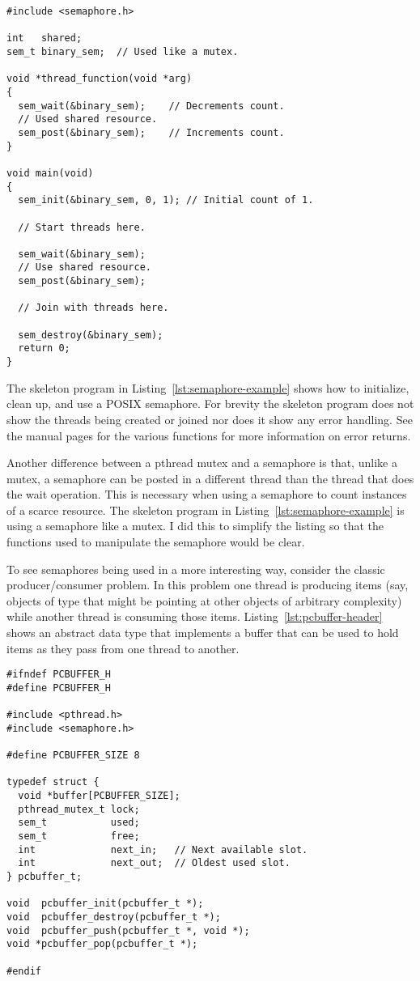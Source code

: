 \begin{lstlisting}[float=tp,frame=single,xleftmargin=0in,
  caption={Semaphore Example},label=lst:semaphore-example]
#include <semaphore.h>

int   shared;
sem_t binary_sem;  // Used like a mutex.

void *thread_function(void *arg)
{
  sem_wait(&binary_sem);    // Decrements count.
  // Used shared resource.
  sem_post(&binary_sem);    // Increments count.
}

void main(void)
{
  sem_init(&binary_sem, 0, 1); // Initial count of 1.
  
  // Start threads here.
  
  sem_wait(&binary_sem);
  // Use shared resource.
  sem_post(&binary_sem);
  
  // Join with threads here.
  
  sem_destroy(&binary_sem);
  return 0;
}
\end{lstlisting}

The skeleton program in Listing~\ref{lst:semaphore-example} shows how to initialize, clean up,
and use a POSIX semaphore. For brevity the skeleton program does not show the threads being
created or joined nor does it show any error handling. See the manual pages for the various
functions for more information on error returns.

Another difference between a pthread mutex and a semaphore is that, unlike a mutex, a semaphore
can be posted in a different thread than the thread that does the wait operation. This is
necessary when using a semaphore to count instances of a scarce resource. The skeleton program
in Listing~\ref{lst:semaphore-example} is using a semaphore like a mutex. I did this to simplify
the listing so that the functions used to manipulate the semaphore would be clear.

To see semaphores being used in a more interesting way, consider the classic producer/consumer
problem. In this problem one thread is producing items (say, objects of type 
that might be pointing at other objects of arbitrary complexity) while another thread is
consuming those items. Listing~\ref{lst:pcbuffer-header} shows an abstract data type that
implements a buffer that can be used to hold items as they pass from one thread to another.

\begin{lstlisting}[float=tp,frame=single,xleftmargin=0in,
  caption={Producer/Consumer Abstract Type},label=lst:pcbuffer-header]
#ifndef PCBUFFER_H
#define PCBUFFER_H

#include <pthread.h>
#include <semaphore.h>

#define PCBUFFER_SIZE 8

typedef struct {
  void *buffer[PCBUFFER_SIZE];
  pthread_mutex_t lock;
  sem_t           used;
  sem_t           free;
  int             next_in;   // Next available slot.
  int             next_out;  // Oldest used slot.
} pcbuffer_t;

void  pcbuffer_init(pcbuffer_t *);
void  pcbuffer_destroy(pcbuffer_t *);
void  pcbuffer_push(pcbuffer_t *, void *);
void *pcbuffer_pop(pcbuffer_t *);

#endif
\end{lstlisting}

